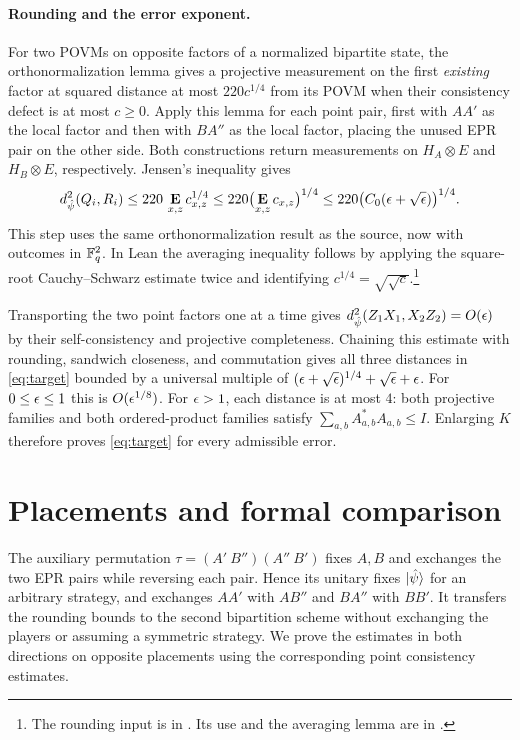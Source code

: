 \documentclass[11pt]{article}
\begin{document}
\paragraph{Rounding and the error exponent.}
For two POVMs on opposite factors of a normalized bipartite state, the
orthonormalization lemma gives a projective measurement on the first
\emph{existing} factor at squared distance at most $220c^{1/4}$ from its
POVM when their consistency defect is at most $c\geq0$.  Apply this lemma
for each point pair, first with $AA'$ as the local factor and then with
$BA''$ as the local factor, placing the unused EPR pair on the other side.
Both constructions return measurements on $H_A\otimes E$ and
$H_B\otimes E$, respectively.  Jensen's inequality gives
\[
 d_{\hat\psi}^2(Q_i,R_i)
 \leq220\,\mathop{\bf E\/}_{x,z}c_{x,z}^{1/4}
 \leq220\bigl(\mathop{\bf E\/}_{x,z}c_{x,z}\bigr)^{1/4}
 \leq220\bigl(C_0(\epsilon+\sqrt{\epsilon})\bigr)^{1/4}.
\]
This step uses the same orthonormalization result as the source, now with
outcomes in $\mathbb{F}_q^2$.  In Lean the averaging inequality follows by applying
the square-root Cauchy--Schwarz estimate twice and identifying
$c^{1/4}=\sqrt{\sqrt c}$.\footnote{The rounding input is
 in
.
Its use and the averaging lemma  are in
.}

Transporting the two point factors one at a time gives
$d_{\hat\psi}^2(Z_1X_1,X_2Z_2)=O(\epsilon)$ by their self-consistency and
projective completeness.  Chaining this estimate with rounding, sandwich
closeness, and commutation gives all three distances in \eqref{eq:target}
bounded by a universal multiple of
$(\epsilon+\sqrt{\epsilon})^{1/4}+\sqrt{\epsilon}+\epsilon$.
For $0\leq\epsilon\leq1$ this is $O(\epsilon^{1/8})$.  For $\epsilon>1$, each distance
is at most $4$: both projective families and both ordered-product families
satisfy $\sum_{a,b}A_{a,b}^*A_{a,b}\leq I$.
Enlarging $K$ therefore proves \eqref{eq:target} for every admissible error.

\section{Placements and formal comparison}

The auxiliary permutation $\tau=(A'\ B'')(A''\ B')$ fixes $A,B$ and
exchanges the two EPR pairs while reversing each pair.  Hence its unitary
fixes $\ket{\hat\psi}$ for an arbitrary strategy, and exchanges $AA'$ with
$AB''$ and $BA''$ with $BB'$.  It transfers the rounding bounds to the
second bipartition scheme without exchanging the players or assuming a
symmetric strategy.  We prove the estimates in both directions on opposite
placements using the corresponding point consistency estimates.
\end{document}
